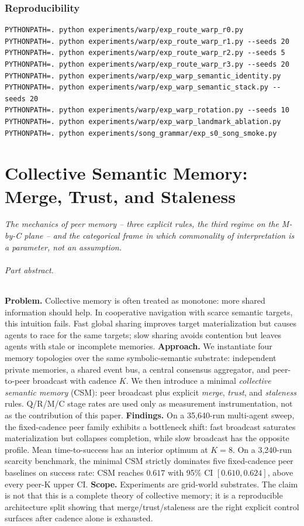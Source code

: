 \documentclass{article}
\begin{document}
\section{Reproducibility}
\label{p3:app:repro}
\begin{verbatim}
PYTHONPATH=. python experiments/warp/exp_route_warp_r0.py
PYTHONPATH=. python experiments/warp/exp_route_warp_r1.py --seeds 20
PYTHONPATH=. python experiments/warp/exp_route_warp_r2.py --seeds 5
PYTHONPATH=. python experiments/warp/exp_route_warp_r3.py --seeds 20
PYTHONPATH=. python experiments/warp/exp_warp_semantic_identity.py
PYTHONPATH=. python experiments/warp/exp_warp_semantic_stack.py --seeds 20
PYTHONPATH=. python experiments/warp/exp_warp_rotation.py --seeds 10
PYTHONPATH=. python experiments/warp/exp_warp_landmark_ablation.py
PYTHONPATH=. python experiments/song_grammar/exp_s0_song_smoke.py
\end{verbatim}
\FloatBarrier

\clearpage
\part{Collective Semantic Memory: Merge, Trust, and Staleness}
\noindent\textit{The mechanics of peer memory -- three explicit rules, the third regime on the M-by-C plane -- and the categorical frame in which commonality of interpretation is a parameter, not an assumption.}

\paragraph{Part abstract.} \textbf{Problem.} Collective memory is often treated as monotone: more shared information should help. In cooperative navigation with scarce semantic targets, this intuition fails. Fast global sharing improves target materialization but causes agents to race for the same targets; slow sharing avoids contention but leaves agents with stale or incomplete memories.
\textbf{Approach.} We instantiate four memory topologies over the same symbolic-semantic substrate: independent private memories, a shared event bus, a central consensus aggregator, and peer-to-peer broadcast with cadence $K$. We then introduce a minimal \emph{collective semantic memory} (CSM): peer broadcast plus explicit \emph{merge}, \emph{trust}, and \emph{staleness} rules. Q/R/M/C stage rates are used only as measurement instrumentation, not as the contribution of this paper.
\textbf{Findings.} On a 35{,}640-run multi-agent sweep, the fixed-cadence peer family exhibits a bottleneck shift: fast broadcast saturates materialization but collapses completion, while slow broadcast has the opposite profile. Mean time-to-success has an interior optimum at $K{=}8$. On a 3{,}240-run scarcity benchmark, the minimal CSM strictly dominates five fixed-cadence peer baselines on success rate: CSM reaches $0.617$ with 95\% CI $[0.610,0.624]$, above every peer-K upper CI.
\textbf{Scope.} Experiments are grid-world substrates. The claim is not that this is a complete theory of collective memory; it is a reproducible architecture split showing that merge/trust/staleness are the right explicit control surfaces after cadence alone is exhausted.
\end{document}
